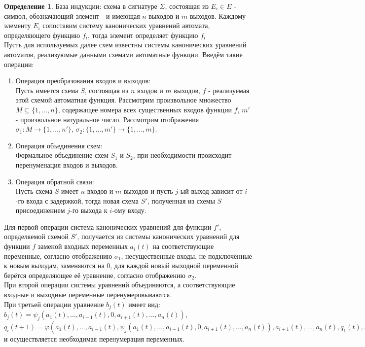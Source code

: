 \documentclass[a4paper, 12pt]{article}
\renewcommand{\phi}{\varphi}
\theoremstyle{definition}
\newtheorem*{definition}{Определение}
\theoremstyle{plain}
\theoremstyle{remark}
\begin{document}
  \begin{definition}
    База индукции: схема в сигнатуре $\Sigma$, состоящая из $E_i\in E$ - символ, обозначающий элемент - и имеющая $n$ выходов и $m$ выходов. Каждому элементу $E_i$ сопоставим систему канонических уравнений автомата, определяющего функцию $f_i$, тогда элемент определяет функцию $f_i$\\
    Пусть для используемых далее схем известны системы канонических уравнений автоматов, реализуюмые данными схемами автоматные функции. Введём такие операции:\\
    \begin{enumerate}
      \item Операция преобразования входов и выходов:\\
      Пусть имеется схема $S$, состоящая из $n$ входов и $m$ выходов, $f$ - реализуемая этой схемой автоматная функция. Рассмотрим произвольное множество $M\subseteq\{1,\ldots,n\}$, содержащее номера всех существенных входов функции $f$, $m'$ - произвольное натуральное число. Рассмотрим отображения $\sigma_1:M\rightarrow\{1,\ldots,n'\}$, $\sigma_2:\{1,\ldots,m'\}\rightarrow\{1,\ldots,m\}$.
      \item Операция объединения схем:\\
      Формальное объединение схем $S_1$ и $S_2$, при необходимости происходит перенуменация входов и выходов.
      \item Операция обратной связи:\\
      Пусть схема $S$ имеет $n$ входов и $m$ выходов и пусть $j$-ый выход зависит от $i$-го входа с задержкой, тогда новая схема $S'$, полученная из схемы $S$ присоединением $j$-го выхода к $i$-ому входу.
    \end{enumerate}
    Для первой операции система канонических уравнений для функции $f'$, определяемой схемой $S'$, получается из системы канонических уравнений для функции $f$ заменой входных переменных $a_i(t)$ на соответствующие переменные, согласно отображению $\sigma_1$, несущественные входы, не подключённые к новым выходам, заменяются на 0, для каждой новый выходной переменной берётся определяющее её уравнение, согласно отображению $\sigma_2$.\\
    При второй операции системы уравнений объединяются, а соответствующие входные и выходные переменные перенумеровываются.\\
    При третьей операции уравнение $b_j(t)$ имеет вид: $b_j(t)=\psi_j(a_1(t),\ldots,a_{i-1}(t),0,a_{i+1}(t),\ldots,a_n(t))$, $q_i(t+1)=\phi(a_1(t),\ldots,a_{i-1}(t),\psi_j(a_1(t),\ldots,a_{i-1}(t),0,a_{i+1}(t),\ldots,a_n(t)),a_{i+1}(t),\ldots,a_n(t),q_1(t),\ldots,q_k(t))$ и осуществляется необходимая перенумерация переменных.
  \end{definition}
\end{document}
